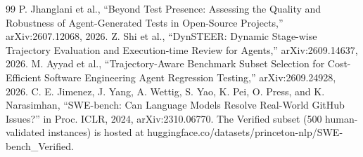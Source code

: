 \documentclass[conference]{IEEEtran}
\begin{document}
\begin{thebibliography}{99}
 P. Jhanglani et al., ``Beyond Test Presence: Assessing the Quality and Robustness of Agent-Generated Tests in Open-Source Projects,'' arXiv:2607.12068, 2026.
 Z. Shi et al., ``DynSTEER: Dynamic Stage-wise Trajectory Evaluation and Execution-time Review for Agents,'' arXiv:2609.14637, 2026.
 M. Ayyad et al., ``Trajectory-Aware Benchmark Subset Selection for Cost-Efficient Software Engineering Agent Regression Testing,'' arXiv:2609.24928, 2026.
 C. E. Jimenez, J. Yang, A. Wettig, S. Yao, K. Pei, O. Press, and K. Narasimhan, ``SWE-bench: Can Language Models Resolve Real-World GitHub Issues?'' in Proc. ICLR, 2024, arXiv:2310.06770. The Verified subset (500 human-validated instances) is hosted at huggingface.co/datasets/princeton-nlp/SWE-bench\_Verified.
\end{thebibliography}
\end{document}
